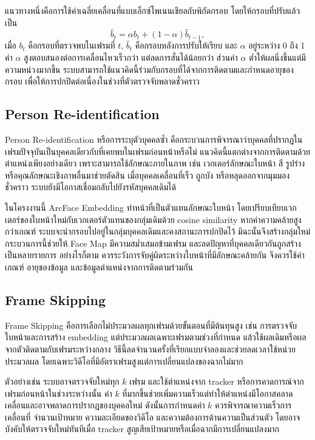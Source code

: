 แนวทางหนึ่งคือการใช้ค่าเฉลี่ยเคลื่อนที่แบบเอ็กซ์โพเนนเชียลกับพิกัดกรอบ โดยให้กรอบที่ปรับแล้วเป็น
\begin{equation}
\hat{b}_{t}=\alpha b_{t}+(1-\alpha)\hat{b}_{t-1},
\end{equation}
เมื่อ $b_t$ คือกรอบที่ตรวจพบในเฟรมที่ $t$, $\hat{b}_t$ คือกรอบหลังการปรับให้เรียบ และ $\alpha$ อยู่ระหว่าง 0 ถึง 1 ค่า $\alpha$ สูงตอบสนองต่อการเคลื่อนไหวเร็วกว่า แต่ลดการสั่นได้น้อยกว่า ส่วนค่า $\alpha$ ต่ำให้ผลนิ่งขึ้นแต่มีความหน่วงมากขึ้น ระบบสามารถใช้แนวคิดนี้ร่วมกับกรอบที่ได้จากการติดตามและกำหนดอายุของกรอบ เพื่อให้การปกปิดต่อเนื่องในช่วงที่ตัวตรวจจับพลาดชั่วคราว

\subsection{Person Re-identification}

Person Re-identification หรือการระบุตัวบุคคลซ้ำ คือกระบวนการพิจารณาว่าบุคคลที่ปรากฏในเฟรมปัจจุบันเป็นบุคคลเดียวกับที่เคยพบในเฟรมก่อนหน้าหรือไม่ แนวคิดนี้แตกต่างจากการติดตามด้วยตำแหน่งเพียงอย่างเดียว เพราะสามารถใช้ลักษณะภายในภาพ เช่น เวกเตอร์ลักษณะใบหน้า สี รูปร่าง หรือคุณลักษณะเชิงภาพอื่นมาช่วยตัดสิน เมื่อบุคคลเคลื่อนที่เร็ว ถูกบัง หรือหลุดออกจากมุมมองชั่วคราว ระบบยังมีโอกาสเชื่อมกลับไปยังรหัสบุคคลเดิมได้ \cite{deng2019arcface,bewley2016sort}

ในโครงงานนี้ ArcFace Embedding ทำหน้าที่เป็นตัวแทนลักษณะใบหน้า โดยเปรียบเทียบเวกเตอร์ของใบหน้าใหม่กับเวกเตอร์ตัวแทนของกลุ่มเดิมด้วย cosine similarity หากค่าความคล้ายสูงกว่าเกณฑ์ ระบบจะนำกรอบไปอยู่ในกลุ่มบุคคลเดิมและคงสถานะการปกปิดไว้ มิฉะนั้นจึงสร้างกลุ่มใหม่ กระบวนการนี้ช่วยให้ Face Map มีความสม่ำเสมอข้ามเฟรม และลดปัญหาที่บุคคลเดียวกันถูกสร้างเป็นหลายรายการ อย่างไรก็ตาม ควรระวังการจับคู่ผิดระหว่างใบหน้าที่มีลักษณะคล้ายกัน จึงควรใช้ค่าเกณฑ์ อายุของข้อมูล และข้อมูลตำแหน่งจากการติดตามร่วมกัน

\subsection{Frame Skipping}

Frame Skipping คือการเลือกไม่ประมวลผลทุกเฟรมด้วยขั้นตอนที่มีต้นทุนสูง เช่น การตรวจจับใบหน้าและการสร้าง embedding แต่ประมวลผลเฉพาะเฟรมตามช่วงที่กำหนด แล้วใช้ผลเดิมหรือผลจากตัวติดตามกับเฟรมระหว่างกลาง วิธีนี้ลดจำนวนครั้งที่เรียกแบบจำลองและช่วยลดเวลาใช้หน่วยประมวลผล โดยเฉพาะวิดีโอที่มีอัตราเฟรมสูงแต่การเปลี่ยนแปลงของฉากไม่มาก \cite{zhu2017flow}

ตัวอย่างเช่น ระบบอาจตรวจจับใหม่ทุก $k$ เฟรม และใช้ตำแหน่งจาก tracker หรือการคาดการณ์จากเฟรมก่อนหน้าในช่วงระหว่างนั้น ค่า $k$ ที่มากขึ้นช่วยเพิ่มความเร็วแต่ทำให้ตำแหน่งมีโอกาสคลาดเคลื่อนและอาจพลาดการปรากฏของบุคคลใหม่ ดังนั้นการกำหนดค่า $k$ ควรพิจารณาความเร็วการเคลื่อนที่ จำนวนเป้าหมาย ความละเอียดของวิดีโอ และความต้องการด้านความเป็นส่วนตัว โดยอาจบังคับให้ตรวจจับใหม่ทันทีเมื่อ tracker สูญเสียเป้าหมายหรือเมื่อฉากมีการเปลี่ยนแปลงมาก


